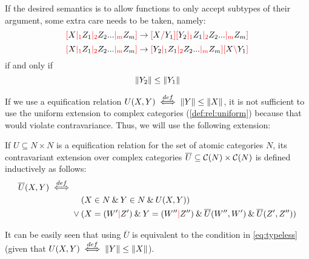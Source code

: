\documentclass[main.tex]{subfiles}
\begin{document}
If the desired semantics is to allow functions to only accept subtypes of
their argument, some extra care needs to be taken, namely:
\[ \textcolor{red}{[} X \textcolor{red}{|_{1}} Z_1 \textcolor{red}{|_{2}} Z_2 ... \textcolor{red}{|_{m}} Z_m \textcolor{red}{]} \rightarrow \textcolor{red}{[} X \textcolor{red}{/} Y_1 \textcolor{red}{]} \textcolor{red}{[} Y_2 \textcolor{red}{|_{1}} Z_1 \textcolor{red}{|_{2}} Z_2 ... \textcolor{red}{|_{m}} Z_m \textcolor{red}{]} \]
\[ \textcolor{red}{[} X \textcolor{red}{|_{1}} Z_1 \textcolor{red}{|_{2}} Z_2 ... \textcolor{red}{|_{m}} Z_m \textcolor{red}{]} \rightarrow \textcolor{red}{[} Y_2 \textcolor{red}{|_{1}} Z_1 \textcolor{red}{|_{2}} Z_2 ... \textcolor{red}{|_{m}} Z_m \textcolor{red}{]} \textcolor{red}{[} X \textcolor{red}{\backslash} Y_1 \textcolor{red}{]} \]
if and only if 
\begin{equation}\label{eq:typeless}
    \|Y_2\| \leq \|Y_1\|
\end{equation}

If we use a equification relation $U(X, Y) \overset{def}{\iff} \|Y\| \leq \|X\|$,
it is not sufficient to use the uniform extension to complex categories
(\cref{def:rel:uniform}) because that would violate contravariance. Thus,
we will use the following extension:
\begin{defn}
    If $U \subseteq N \times N$ is a equification relation
    for the set of
    atomic categories $N$, its contravariant extension over complex categories
    $\overline{U} \subseteq \mathcal{C}( N ) \times \mathcal{C}( N )$ is defined
    inductively as follows:
    \begin{align*}
        \overline{U}(X, Y) \defiff & \\
        & \phantom{{}\lor{}} (X \in N \land Y \in N \land U(X, Y)) \\
        & \lor (X = (W' \mc Z') \land Y = (W'' \mc Z'') \land \overline{U}(W'', W')
        \land \overline{U}(Z', Z'')) \\
    \end{align*}
\end{defn}

It can be easily seen that using 
$\overline{U}$ is equivalent
to the condition in \cref{eq:typeless}
(given that $U(X, Y) \overset{def}{\iff} \|Y\| \leq \|X\|$).
\end{document}
